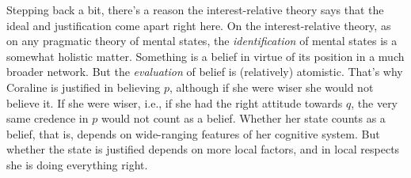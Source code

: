 \documentclass[11pt,oneside]{book}
\begin{document}
{Stepping back a bit, there's a reason the interest-relative theory says that the ideal and justification come apart right here. On the interest-relative theory, as on any pragmatic theory of mental states, the \textit{identification} of mental states is a somewhat holistic matter. Something is a belief in virtue of its position in a much broader network. But the \textit{evaluation} of belief is (relatively) atomistic. That's why Coraline is justified in believing $p$, although if she were wiser she would not believe it. If she were wiser, i.e., if she had the right attitude towards $q$, the very same credence in $p$ would not count as a belief. Whether her state counts as a belief, that is, depends on wide-ranging features of her cognitive system. But whether the state is justified depends on more local factors, and in local respects she is doing everything right.}
\end{document}
